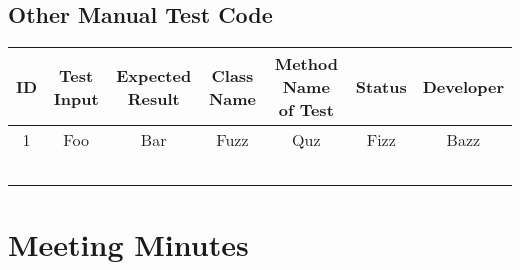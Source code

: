 \documentclass[11pt]{article}
\begin{document}
\subsection{Other Manual Test Code}
\label{sec:org4e9e2d0}
\small
\begin{center}
\begin{tabular}{|c|c|c|c|c|c|c|}
ID & Test Input & Expected Result & Class Name & Method Name of Test & Status & Developer\\
\hline
1 & Foo & Bar & Fuzz & Quz & Fizz & Bazz\\
 &  &  &  &  &  & \\
 &  &  &  &  &  & \\
 &  &  &  &  &  & \\
 &  &  &  &  &  & \\
 &  &  &  &  &  & \\
\end{tabular}
\end{center}
\normalsize

\section{Meeting Minutes}
\label{sec:orgf256917}
\end{document}
